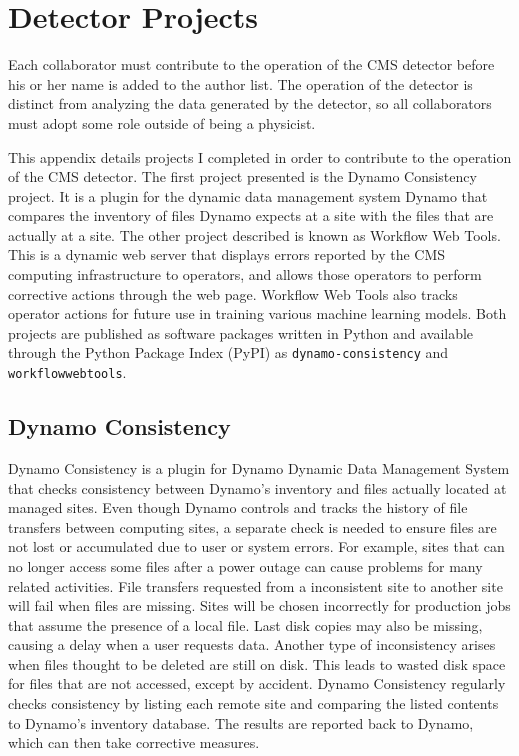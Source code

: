 \chapter{Detector Projects} \label{app:project}

Each collaborator must contribute to the operation of the CMS detector
before his or her name is added to the author list.
The operation of the detector is distinct from analyzing the data generated by the detector,
so all collaborators must adopt some role outside of being a physicist.

This appendix details projects I completed
in order to contribute to the operation of the CMS detector.
The first project presented is the Dynamo Consistency project.
It is a plugin for the dynamic data management system Dynamo \cite{iiyama2020dynamo}
that compares the inventory of files Dynamo expects at a site
with the files that are actually at a site.
The other project described is known as Workflow Web Tools.
This is a dynamic web server that displays errors reported
by the CMS computing infrastructure to operators,
and allows those operators to perform corrective actions through the web page.
Workflow Web Tools also tracks operator actions for future use
in training various machine learning models.
Both projects are published as software packages written in Python
\cite{van1995python, 10.5555/1593511}
and available through the Python Package Index (PyPI) as
\texttt{dynamo-consistency} and \texttt{workflowwebtools}.


\section{Dynamo Consistency}

Dynamo Consistency is a plugin for Dynamo Dynamic Data Management System that checks
consistency between Dynamo’s inventory and files actually located at managed sites.
Even though Dynamo controls and tracks the history of file transfers between computing sites,
a separate check is needed to ensure files are
not lost or accumulated due to user or system errors.
For example, sites that can no longer access some files after a power outage
can cause problems for many related activities.
File transfers requested from a inconsistent site to another site will fail
when files are missing.
Sites will be chosen incorrectly for production jobs
that assume the presence of a local file.
Last disk copies may also be missing, causing a delay when a user requests data.
Another type of inconsistency arises when files thought to be deleted are still on disk.
This leads to wasted disk space for files that are not accessed, except by accident.
Dynamo Consistency regularly checks consistency by listing each remote site and
comparing the listed contents to Dynamo’s inventory database.
The results are reported back to Dynamo, which can then take corrective measures.

